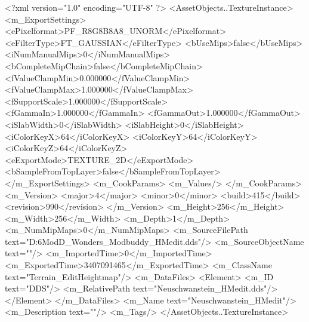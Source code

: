 <?xml version="1.0" encoding="UTF-8" ?>
<AssetObjects..TextureInstance>
	<m_ExportSettings>
		<ePixelformat>PF_R8G8B8A8_UNORM</ePixelformat>
		<eFilterType>FT_GAUSSIAN</eFilterType>
		<bUseMips>false</bUseMips>
		<iNumManualMips>0</iNumManualMips>
		<bCompleteMipChain>false</bCompleteMipChain>
		<fValueClampMin>0.000000</fValueClampMin>
		<fValueClampMax>1.000000</fValueClampMax>
		<fSupportScale>1.000000</fSupportScale>
		<fGammaIn>1.000000</fGammaIn>
		<fGammaOut>1.000000</fGammaOut>
		<iSlabWidth>0</iSlabWidth>
		<iSlabHeight>0</iSlabHeight>
		<iColorKeyX>64</iColorKeyX>
		<iColorKeyY>64</iColorKeyY>
		<iColorKeyZ>64</iColorKeyZ>
		<eExportMode>TEXTURE_2D</eExportMode>
		<bSampleFromTopLayer>false</bSampleFromTopLayer>
	</m_ExportSettings>
	<m_CookParams>
		<m_Values/>
	</m_CookParams>
	<m_Version>
		<major>4</major>
		<minor>0</minor>
		<build>415</build>
		<revision>990</revision>
	</m_Version>
	<m_Height>256</m_Height>
	<m_Width>256</m_Width>
	<m_Depth>1</m_Depth>
	<m_NumMipMaps>0</m_NumMipMaps>
	<m_SourceFilePath text="D:\Civ6Mod\3D_Wonders_Modbuddy\Modbuddy\Neuschwanstein\Neuschwanstein_HMedit.dds"/>
	<m_SourceObjectName text=""/>
	<m_ImportedTime>0</m_ImportedTime>
	<m_ExportedTime>3407091465</m_ExportedTime>
	<m_ClassName text="Terrain_EditHeightmap"/>
	<m_DataFiles>
		<Element>
			<m_ID text="DDS"/>
			<m_RelativePath text="Neuschwanstein_HMedit.dds"/>
		</Element>
	</m_DataFiles>
	<m_Name text="Neuschwanstein_HMedit"/>
	<m_Description text=""/>
	<m_Tags/>
</AssetObjects..TextureInstance>

